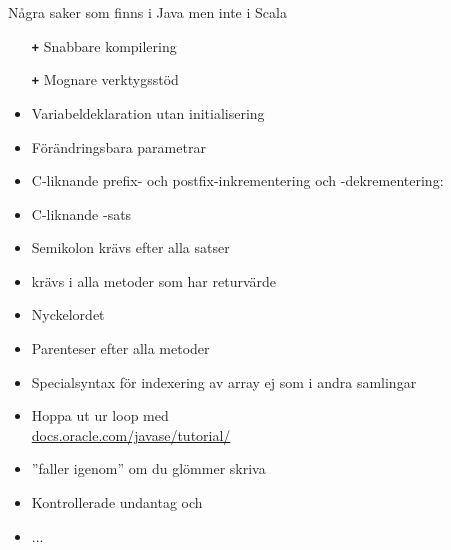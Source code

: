 \begin{Slide}{Några saker som finns i Java men inte i Scala}
\ifkompendium\else
\vspace{-0.7em}\begin{multicols}{2}\SlideFontTiny
\fi
\begin{itemize}
\item[\textbf{\texttt{+}}] Snabbare kompilering

\item[\textbf{\texttt{+}}] Mognare verktygsstöd

\item Variabeldeklaration utan initialisering

\item Förändringsbara parametrar

\item C-liknande prefix- och postfix-inkrementering och -dekrementering: 

\item C-liknande -sats

\item Semikolon krävs efter alla satser

\item {} krävs i alla metoder som har returvärde

\item Nyckelordet 

\item Parenteser efter alla metoder

\item Specialsyntax för indexering av array \code{[]} ej som i andra samlingar

\item Hoppa ut ur loop med  \\ \href{https://docs.oracle.com/javase/tutorial/java/nutsandbolts/branch.html}{docs.oracle.com/javase/tutorial/}

\item {} ''faller igenom'' om du glömmer skriva 

\item Kontrollerade undantag  och 

\item ...
\end{itemize}
\ifkompendium\else
\end{multicols}
\fi
\end{Slide}


